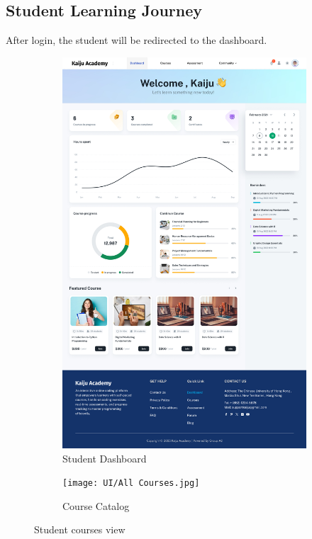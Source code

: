 \documentclass[a4paper, 11pt]{scrreprt}
\begin{document}
\subsection{Student Learning Journey}
After login, the student will be redirected to the dashboard.
\begin{figure}[H]
    \centering
    \begin{subfigure}[b]{0.45\textwidth}
        \centering
        \includegraphics[height=0.4\textheight]{UI/Dashboard.jpg}
        \caption{Student Dashboard}
    \end{subfigure}
    \hfill
    \begin{subfigure}[b]{0.45\textwidth}
        \centering
        \texttt{[image: UI/All Courses.jpg]}
        \caption{Course Catalog}
    \end{subfigure}
    \caption{Student courses view}
\end{figure}
\end{document}
